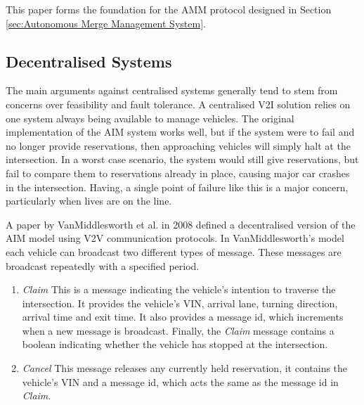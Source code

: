 This paper forms the foundation for the AMM protocol designed in Section \ref{sec:Autonomous Merge Management System}.

\FloatBarrier
\subsection{Decentralised Systems}
\label{subsec:Decentralised Systems}
The main arguments against centralised systems generally tend to stem from concerns over feasibility and fault tolerance. A centralised V2I solution relies on one system always being available to manage vehicles. The original implementation of the AIM system works well, but if the system were to fail and no longer provide reservations, then approaching vehicles will simply halt at the intersection. In a worst case scenario, the system would still give reservations, but fail to compare them to reservations already in place, causing major car crashes in the intersection. Having, a single point of failure like this is a major concern, particularly when lives are on the line.

A paper by VanMiddlesworth et al. in 2008 \citep{VanMiddlesworth2008} defined a decentralised version of the AIM model using V2V communication protocols. In VanMiddlesworth's model each vehicle can broadcast two different types of message. These messages are broadcast repeatedly with a specified period.
\begin{enumerate}
\item \emph{Claim}
This is a message indicating the vehicle's intention to traverse the intersection. It provides the vehicle's VIN, arrival lane, turning direction, arrival time and exit time. It also provides a message id, which increments when a new message is broadcast. Finally, the \emph{Claim} message contains a boolean indicating whether the vehicle has stopped at the intersection.
\item \emph{Cancel}
This message releases any currently held reservation, it contains the vehicle's VIN and a message id, which acts the same as the message id in \emph{Claim}.
\end{enumerate}

